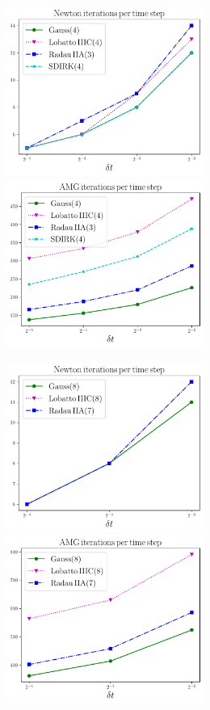 \documentclass[review]{siamart}
\begin{document}
\begin{figure}[H]
\centerline{
\includegraphics[width = 0.575\textwidth]{figures/newton_iters_O4}
\quad
\includegraphics[width = 0.575\textwidth]{figures/amg_iters_O4}
}
\centerline{
\includegraphics[width = 0.575\textwidth]{figures/newton_iters_O7}
\quad
\includegraphics[width = 0.575\textwidth]{figures/amg_iters_O7}
}
\end{figure}
\end{document}
